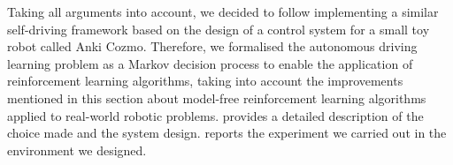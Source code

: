 Taking all arguments into account, we decided to follow \cite{kendall2019learning} implementing a similar self-driving framework based on the design of a control system for a small toy robot called Anki Cozmo.
Therefore, we formalised the autonomous driving learning problem as a Markov decision process to enable the application of reinforcement learning algorithms, taking into account the improvements mentioned in this section about model-free reinforcement learning algorithms applied to real-world robotic problems.
 provides a detailed description of the choice made and the system design.
 reports the experiment we carried out in the environment we designed.







